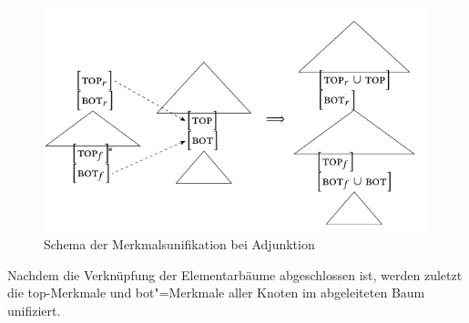 \begin{figure}[p] %
\centering
\includegraphics{graphics/abb54.pdf}
\caption{Schema der Merkmalsunifikation bei Adjunktion\label{fig-tag-merkmal-2}}
\end{figure}    
Nachdem die Verknüpfung der Elementarbäume abgeschlossen ist, werden zuletzt die {\sc top}-Merkmale und {\sc bot}"=Merkmale aller Knoten im abgeleiteten Baum unifiziert. 
 
